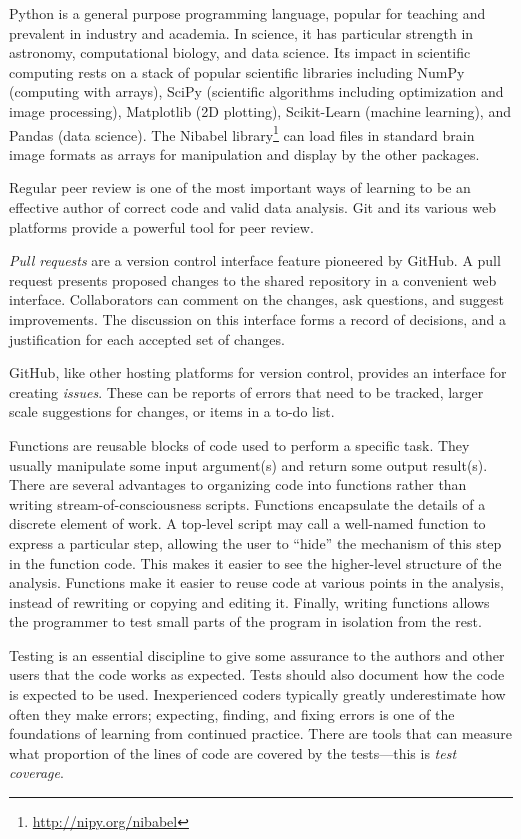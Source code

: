 Python is a general purpose programming language,
popular for teaching and prevalent in industry and academia.
In science, it has particular strength in
astronomy, computational biology, and data science.
Its impact in scientific computing rests on a stack of popular scientific
libraries including NumPy (computing with arrays), SciPy (scientific
algorithms including optimization and image processing), Matplotlib (2D
plotting), Scikit-Learn (machine learning), and Pandas (data science).  The
Nibabel library\footnote{\url{http://nipy.org/nibabel}\label{nibabel}} can
load files in standard brain image formats as arrays for manipulation and
display by the other packages.

Regular peer review is one of the most important ways of learning
to be an effective author of correct code and valid data analysis.  Git and its
various web platforms provide a powerful tool for peer review.

\emph{Pull requests} are a version control interface feature pioneered by
GitHub.  A pull request presents proposed changes to the shared
repository in a convenient web interface. Collaborators can comment on the
changes, ask questions, and suggest improvements.  The discussion on this
interface forms a record of decisions, and a justification for each accepted
set of changes.

GitHub, like other hosting platforms for version control, provides an
interface for creating \emph{issues}.  These can be reports of errors
that need to be tracked, larger scale suggestions for
changes, or items in a to-do list.

Functions are reusable blocks of code used to perform a specific task.
They usually manipulate some input argument(s) and return some output
result(s).
There are several advantages to organizing code into functions rather
than writing stream-of-consciousness scripts.
Functions encapsulate the details of a discrete element of
work.  A top-level script may call a well-named function to express a
particular step, allowing the user to ``hide'' the mechanism of this step in
the function code.  This makes it easier to see the higher-level structure of
the analysis.
Functions make it easier to reuse code at various points in the
analysis, instead of rewriting or copying and editing it.
Finally, writing functions allows the programmer to test small parts of the
program in isolation from the rest.

Testing is an essential discipline to give some assurance to the authors and
other users that the code works as expected.
Tests should also document how the code is expected to be used.
Inexperienced coders typically greatly underestimate how often they make
errors; expecting, finding, and fixing errors is one of the foundations of
learning from continued practice.  There are tools that can measure what
proportion of the lines of code are covered by the tests---this is \emph{test
coverage}.

